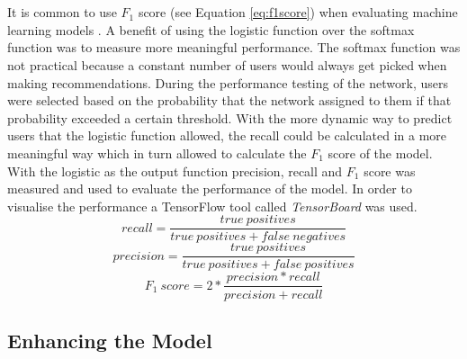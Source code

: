\\\\
It is common to use $F_1$ score (see Equation \ref{eq:f1score}) when evaluating machine learning models \parencite{yang1999re}. A benefit of using the logistic function over the softmax function was to measure more meaningful performance. The softmax function was not practical because a constant number of users would always get picked when making recommendations. During the performance testing of the network, users were selected based on the probability that the network assigned to them if that probability exceeded a certain threshold. With the more dynamic way to predict users that the logistic function allowed, the recall could be calculated in a more meaningful way which in turn allowed to calculate the $F_1$ score of the model. With the logistic as the output function precision, recall and $F_1$ score was measured and used to evaluate the performance of the model. In order to visualise the performance a TensorFlow tool called \textit{TensorBoard} was used.
\begin{equation}
    \label{eq:recall}
    recall = \frac{true\ positives}{true\ positives + false\ negatives}
\end{equation}
\begin{equation}
    \label{eq:precision}
    precision = \frac{true\ positives}{true\ positives + false\ positives}
\end{equation}
\begin{equation}
    \label{eq:f1score}
    F_1\ score = 2 * \frac{precision * recall}{precision + recall}
\end{equation}
\subsection{Enhancing the Model}\label{sect:enhacing_the_model}

